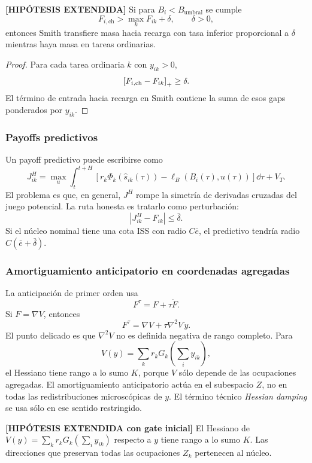 \begin{lema} \textbf{[HIPÓTESIS EXTENDIDA]}
Si para $B_i<B_{\mathrm{umbral}}$ se cumple
\[
  F_{i,\mathrm{ch}}>\max_k F_{ik}+\delta,
  \qquad \delta>0,
\]
entonces Smith transfiere masa hacia recarga con tasa inferior proporcional a $\delta$
mientras haya masa en tareas ordinarias.
\end{lema}

\begin{proof}
Para cada tarea ordinaria $k$ con $y_{ik}>0$,
\[
  \left[F_{i,\mathrm{ch}}-F_{ik}\right]_{+}\ge\delta.
\]
El término de entrada hacia recarga en Smith contiene la suma de esos gaps ponderados
por $y_{ik}$.
\end{proof}

\subsubsection{Payoffs predictivos}

Un payoff predictivo puede escribirse como
\[
  J_{ik}^{H}
  =
  \max_u
  \int_t^{t+H}
  \left[
    r_k\Phi_k(\hat s_{ik}(\tau))-\ell_B(B_i(\tau),u(\tau))
  \right]\dd\tau
  +V_T.
\]
El problema es que, en general, $J^H$ rompe la simetría de derivadas cruzadas del juego
potencial. La ruta honesta es tratarlo como perturbación:
\[
  |J_{ik}^{H}-F_{ik}|\le\bar\delta.
\]
Si el núcleo nominal tiene una cota ISS con radio $C\bar e$, el predictivo tendría radio
$C(\bar e+\bar\delta)$.

\subsubsection{Amortiguamiento anticipatorio en coordenadas agregadas}

La anticipación de primer orden usa
\[
  F^\tau=F+\tau\dot F.
\]
Si $F=\nabla V$, entonces
\[
  F^\tau=\nabla V+\tau\nabla^2V\,\dot y.
\]
El punto delicado es que $\nabla^2V$ no es definida negativa de rango completo. Para
\[
  V(y)=\sum_k r_kG_k\left(\sum_i y_{ik}\right),
\]
el Hessiano tiene rango a lo sumo $K$, porque $V$ sólo depende de las ocupaciones
agregadas. El amortiguamiento anticipatorio actúa en el subespacio $Z$, no en todas las
redistribuciones microscópicas de $y$. El término técnico \emph{Hessian damping} se usa
sólo en ese sentido restringido.

\begin{lema} \textbf{[HIPÓTESIS EXTENDIDA con gate inicial]}
El Hessiano de $V(y)=\sum_k r_kG_k(\sum_i y_{ik})$ respecto a $y$ tiene rango a lo sumo
$K$. Las direcciones que preservan todas las ocupaciones $Z_k$ pertenecen al núcleo.
\end{lema}


